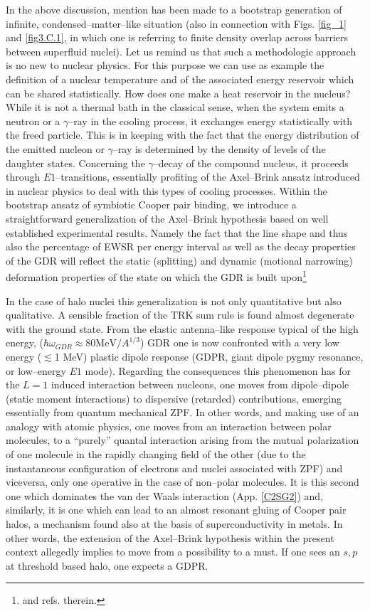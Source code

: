 In the above discussion, mention has been made to a bootstrap generation of infinite, condensed--matter--like situation (also  in connection with Figs. \ref{fig_1} and \ref{fig3.C.1}, in which one is referring to finite density overlap across barriers between superfluid nuclei). Let us remind us that such a methodologic approach is no new to nuclear physics. For this purpose we can use as example the definition of a nuclear temperature and of the associated energy reservoir which can be shared statistically. How does one make a heat reservoir in the nucleus? While it is not a thermal bath in the classical sense, when the system emits a neutron or a $\gamma$--ray in the cooling process, it exchanges energy statistically with the freed particle. This is in keeping with the fact that the energy distribution of the emitted nucleon or $\gamma$--ray is determined by the density of levels of the daughter states. Concerning the $\gamma$--decay of the compound nucleus, it proceeds through $E1$--transitions, essentially profiting of the Axel--Brink ansatz introduced in nuclear physics to deal with this types of cooling processes.
Within the bootstrap ansatz of symbiotic Cooper pair binding, we introduce a straightforward generalization of the Axel--Brink hypothesis based on  well established experimental    results. Namely the fact that the line shape and thus also the percentage of EWSR per energy interval as well as the decay properties of the GDR will reflect the static (splitting) and dynamic (motional narrowing) deformation properties of the state on which the GDR is built upon\footnote{\cite{LeTourneaux:65,Bohr:75,Bortignon:98} and refs. therein.}

In the case of halo nuclei this generalization is not only quantitative but also qualitative. A sensible fraction of the TRK sum rule is found almost degenerate with the ground state. From the elastic antenna--like response typical of the high energy, ($\hbar\omega_{GDR}\approx80\text{MeV}/A^{1/3}$) GDR one is now confronted with a very low energy ($\lesssim$1 MeV) plastic dipole response (GDPR, giant dipole pygmy resonance, or low--energy $E1$ mode). Regarding the consequences this phenomenon has for the $L=1$ induced interaction between nucleons, one moves from dipole--dipole (static moment interactions) to dispersive (retarded) contributions, emerging essentially from quantum mechanical ZPF. In other words, and making use of an analogy with atomic physics, one moves from an interaction between polar molecules, to a ``purely'' quantal interaction arising from the mutual polarization of one molecule in the rapidly changing field of the other (due to the instantaneous configuration of electrons and nuclei associated with ZPF) and viceversa, only one operative in the case of non--polar molecules. It is this second one which dominates the van der Waals interaction (App. \ref{C2SG2}) and, similarly, it is one which can lead to an almost resonant gluing of Cooper pair halos, a mechanism found also at the basis of superconductivity in metals. In other words, the extension of the Axel--Brink hypothesis  within the present context allegedly implies to move from a possibility to a must. If one sees an $s,p$ at threshold based halo, one expects a GDPR.


